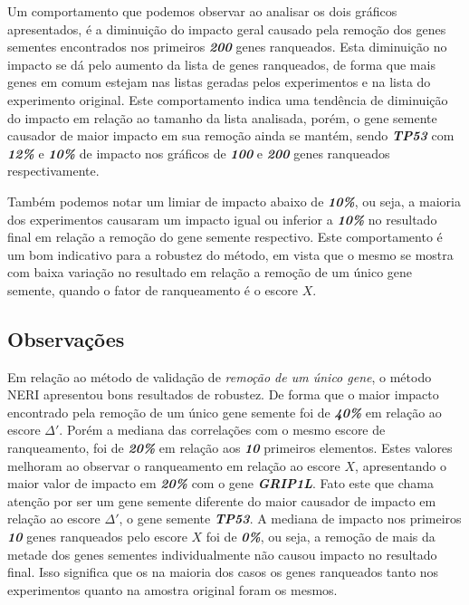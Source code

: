 Um comportamento que podemos observar ao analisar os dois gráficos apresentados, é a diminuição do impacto geral causado pela remoção dos genes sementes encontrados nos primeiros \textsl{\textbf{200}} genes ranqueados. Esta diminuição no impacto se dá pelo aumento da lista de genes ranqueados, de forma que mais genes em comum estejam nas listas geradas pelos experimentos e na lista do experimento original. Este comportamento indica uma tendência de diminuição do impacto em relação ao tamanho da lista analisada, porém, o gene semente causador de maior impacto em sua remoção ainda se mantém, sendo \textsl{\textbf{TP53}} com \textsl{\textbf{12\%}} e \textsl{\textbf{10\%}} de impacto nos gráficos de \textsl{\textbf{100}} e \textsl{\textbf{200}} genes ranqueados respectivamente.

Também podemos notar um limiar de impacto abaixo de \textsl{\textbf{10\%}}, ou seja, a maioria dos experimentos causaram um impacto igual ou inferior a \textsl{\textbf{10\%}} no resultado final em relação a remoção do gene semente respectivo. Este comportamento é um bom indicativo para a robustez do método, em vista que o mesmo se mostra com baixa variação no resultado em relação a remoção de um único gene semente, quando o fator de ranqueamento é o escore $X$.

%
%
%
%
\subsection{Observações}
%
Em relação ao método de validação de \textit{remoção de um único gene}, o método NERI apresentou bons resultados de robustez. De forma que o maior impacto encontrado pela remoção de um único gene semente foi de \textit{\textbf{40\%}} em relação ao escore $\Delta'$. Porém  a mediana das correlações com o mesmo escore de ranqueamento, foi de \textit{\textbf{20\%}} em relação aos \textbf{\textit{10}} primeiros elementos. Estes valores melhoram ao observar o ranqueamento em relação ao escore $X$, apresentando o maior valor de impacto em \textsl{\textbf{20\%}} com o gene \textsl{\textbf{GRIP1L}}. Fato este que chama atenção por ser um gene semente diferente do maior causador de impacto em relação ao escore $\Delta'$, o gene semente \textsl{\textbf{TP53}}. A mediana de impacto nos primeiros \textsl{\textbf{10}} genes ranqueados pelo escore $X$ foi de \textsl{\textbf{0\%}}, ou seja, a remoção de mais da metade dos genes sementes individualmente não causou impacto no resultado final. Isso significa que os na maioria dos casos os genes ranqueados tanto nos experimentos quanto na amostra original foram os mesmos.

